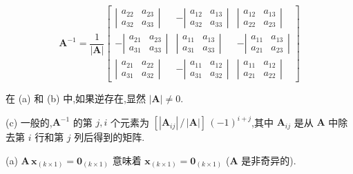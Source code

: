 
\[
\bm{A}^{-1} = \frac{1}{|\bm{A}|}
\begin{bmatrix}
\left|\begin{matrix} a_{22} & a_{23} \\ a_{32} & a_{33} \end{matrix}\right| & -\left|\begin{matrix} a_{12} & a_{13} \\ a_{32} & a_{33} \end{matrix}\right| & \left|\begin{matrix} a_{12} & a_{13} \\ a_{22} & a_{23} \end{matrix}\right| \\[12pt]
-\left|\begin{matrix} a_{21} & a_{23} \\ a_{31} & a_{33} \end{matrix}\right| & \left|\begin{matrix} a_{11} & a_{13} \\ a_{31} & a_{33} \end{matrix}\right| & -\left|\begin{matrix} a_{11} & a_{13} \\ a_{21} & a_{23} \end{matrix}\right| \\[12pt]
\left|\begin{matrix} a_{21} & a_{22} \\ a_{31} & a_{32} \end{matrix}\right| & -\left|\begin{matrix} a_{11} & a_{12} \\ a_{31} & a_{32} \end{matrix}\right| & \left|\begin{matrix} a_{11} & a_{12} \\ a_{21} & a_{22} \end{matrix}\right|
\end{bmatrix}
\]

在 (a) 和 (b) 中,如果逆存在,显然 $|\bm{A}| \neq 0$.

(c) 一般的,$\bm{A}^{-1}$ 的第 $j,i$ 个元素为 $[|\bm{A}_{ij}|\,/\,|\bm{A}|]\,(-1)^{i+j}$,其中 $\bm{A}_{ij}$ 是从 $\bm{A}$ 中除去第 $i$ 行和第 $j$ 列后得到的矩阵.


(a) $\bm{A}\,\bm{x}_{(k\times 1)} = \bm{0}_{(k\times 1)}$ 意味着 $\bm{x}_{(k\times 1)} = \bm{0}_{(k\times 1)}$ ($\bm{A}$ 是非奇异的).

